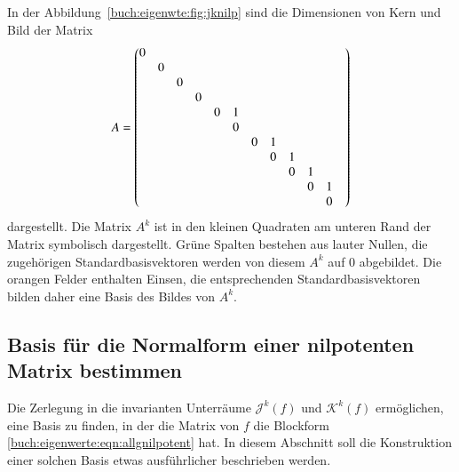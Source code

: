 \begin{beispiel}
In der Abbildung~\ref{buch:eigenwte:fig:jknilp} sind die Dimensionen
von Kern und Bild der Matrix
\[
\setcounter{MaxMatrixCols}{12}
A=\begin{pmatrix}
0& & & & & & & & & & & \\
 &0& & & & & & & & & & \\
 & &0& & & & & & & & & \\
 & & &0& & & & & & & & \\
 & & & &0&1& & & & & & \\
 & & & & &0& & & & & & \\
 & & & & & &0&1& & & & \\
 & & & & & & &0&1& & & \\
 & & & & & & & &0&1& & \\
 & & & & & & & & &0&1& \\
 & & & & & & & & & &0&
\end{pmatrix}
\]
dargestellt.
Die Matrix $A^k$ ist in den kleinen Quadraten am unteren Rand der Matrix
symbolisch dargestellt.
Grüne Spalten bestehen aus lauter Nullen, die zugehörigen
Standardbasisvektoren werden von diesem $A^k$ auf $0$ abgebildet.
Die orangen Felder enthalten Einsen, die entsprechenden Standardbasisvektoren
bilden daher eine Basis des Bildes von $A^k$.
\end{beispiel}

%
%
\subsection{Basis für die Normalform einer nilpotenten Matrix bestimmen
\label{buch:subsection:normalform-einer-nilpotenten-matrix}}
Die Zerlegung in die invarianten Unterräume $\mathcal{J}^k(f)$ und
$\mathcal{K}^k(f)$ ermöglichen, eine Basis zu finden, in der die
Matrix von $f$ die Blockform \eqref{buch:eigenwerte:eqn:allgnilpotent}
hat.
In diesem Abschnitt soll die Konstruktion einer solchen Basis
etwas ausführlicher beschrieben werden.

